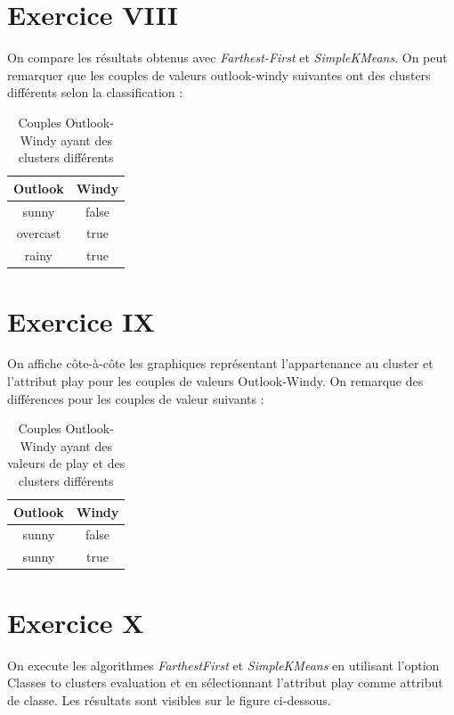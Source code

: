 \documentclass[a4paper, 11pt]{report}
\begin{document}
        \section{Exercice VIII}
        On compare les résultats obtenus avec \emph{Farthest-First} et \emph{SimpleKMeans}. On peut remarquer que les couples de valeurs outlook-windy suivantes ont des clusters différents selon la classification : 
        \begin{table}[h!]
        \centering
        \begin{tabular}{| c | c |}
         \hline
         Outlook & Windy \\
         \hline
         sunny & false \\
         overcast & true \\
         rainy & true\\
         \hline
        
        \end{tabular}
        \caption{Couples Outlook-Windy ayant des clusters différents}
        \label{tab:exo8}
        \end{table}
        
        \section{Exercice IX}
        On affiche côte-à-côte les graphiques représentant l'appartenance au cluster et l'attribut play pour les couples de valeurs Outlook-Windy.
        On remarque des différences pour les couples de valeur suivants :
        \begin{table}[h!]
        \centering
        \begin{tabular}{| c | c |}
         \hline
         Outlook & Windy \\
         \hline
         sunny & false \\
         sunny & true \\
         \hline
        
        \end{tabular}
        \caption{Couples Outlook-Windy ayant des valeurs de play et des clusters différents}
        \label{tab:exo9}
        \end{table}
        

	\section{Exercice X}
	On execute les algorithmes \emph{FarthestFirst} et \emph{SimpleKMeans} en utilisant l'option Classes to clusters evaluation et en sélectionnant l'attribut play comme attribut de classe. Les résultats sont visibles sur le figure ci-dessous.
\end{document}
